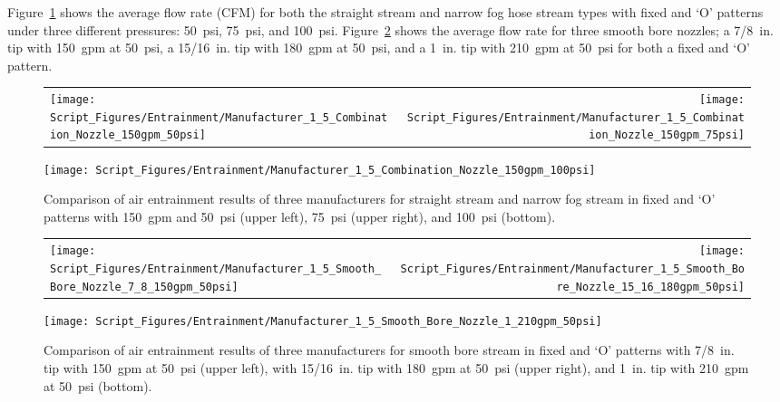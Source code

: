 \documentclass[12pt,oneside]{book}
\begin{document}
Figure~\ref{fig:1_5_Interior_Combination_Manufacturer} shows the average flow rate (CFM) for both the straight stream and narrow fog hose stream types with fixed and `O' patterns under three different pressures: 50~psi, 75~psi, and 100~psi. Figure~\ref{fig:1_5_Interior_Smooth_Bore_Manufacturer} shows the average flow rate for three smooth bore nozzles; a 7/8~in. tip with 150~gpm at 50~psi, a 15/16~in. tip with 180~gpm at 50~psi, and a 1~in. tip with 210~gpm at 50~psi for both a fixed and `O' pattern.

\begin{figure}[!ht]
\begin{tabular*}{\textwidth}{lr}
\texttt{[image: Script\_Figures/Entrainment/Manufacturer\_1\_5\_Combination\_Nozzle\_150gpm\_50psi]} &
\texttt{[image: Script\_Figures/Entrainment/Manufacturer\_1\_5\_Combination\_Nozzle\_150gpm\_75psi]} \\
\end{tabular*}
\centering
\texttt{[image: Script\_Figures/Entrainment/Manufacturer\_1\_5\_Combination\_Nozzle\_150gpm\_100psi]}
\caption[Average Air Entrainment Varying Manufacturer with Combination Nozzles]{Comparison of air entrainment results of three manufacturers for straight stream and narrow fog stream in fixed and `O' patterns with 150~gpm and 50~psi (upper left), 75~psi (upper right), and 100~psi (bottom).}
\label{fig:1_5_Interior_Combination_Manufacturer}
\end{figure}

\begin{figure}[!ht]
\begin{tabular*}{\textwidth}{lr}
\texttt{[image: Script\_Figures/Entrainment/Manufacturer\_1\_5\_Smooth\_Bore\_Nozzle\_7\_8\_150gpm\_50psi]} &
\texttt{[image: Script\_Figures/Entrainment/Manufacturer\_1\_5\_Smooth\_Bore\_Nozzle\_15\_16\_180gpm\_50psi]} \\
\end{tabular*}
\centering
\texttt{[image: Script\_Figures/Entrainment/Manufacturer\_1\_5\_Smooth\_Bore\_Nozzle\_1\_210gpm\_50psi]} 
\caption[Average Air Entrainment Varying Manufacturer with Smooth Bore Nozzles]{Comparison of air entrainment results of three manufacturers for smooth bore stream in fixed and `O' patterns with 7/8~in. tip with 150~gpm at 50~psi (upper left), with 15/16~in. tip with 180~gpm at 50~psi (upper right), and 1~in. tip with 210~gpm at 50~psi (bottom).}
\label{fig:1_5_Interior_Smooth_Bore_Manufacturer}
\end{figure}
\end{document}
